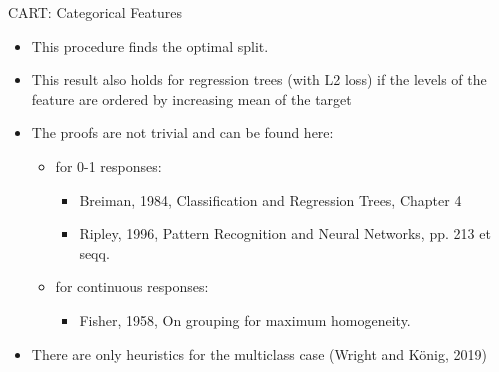 \documentclass[11pt,compress,t,notes=noshow, xcolor=table]{beamer}
\begin{document}
\begin{vbframe}{CART: Categorical Features}

  \begin{itemize}
  \item This procedure finds the optimal split.
  \item This result also holds for regression trees (with L2 loss) if the levels of the feature are ordered by increasing mean of the target
  \item The proofs are not trivial and can be found here:
    \begin{itemize}
    \item for 0-1 responses:
      \begin{itemize}
      \item Breiman, 1984, Classification and Regression Trees, Chapter 4
      \item Ripley, 1996, Pattern Recognition and Neural Networks, pp. 213 et seqq.
      \end{itemize}
    \item for continuous responses:
      \begin{itemize}
      \item Fisher, 1958, On grouping for maximum homogeneity.
      \end{itemize}
    \end{itemize}
  \item There are only heuristics for the multiclass case (Wright and König, 2019)
  \end{itemize}

\end{vbframe}
\end{document}

